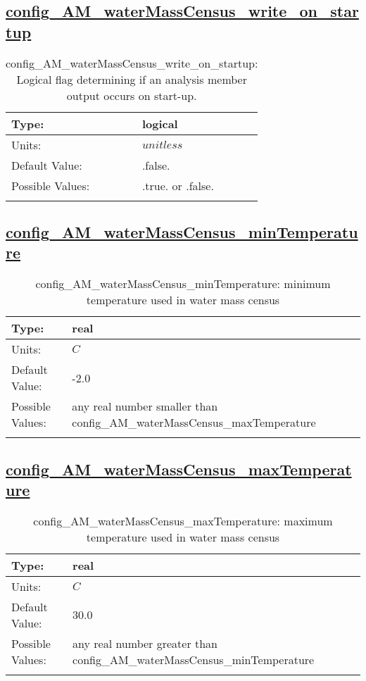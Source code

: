 \subsection[config\_AM\_waterMassCensus\_write\_on\_startup]{\hyperref[sec:nm_tab_AM_waterMassCensus]{config\_AM\_waterMassCensus\_write\_on\_startup}}
\label{subsec:nm_sec_config_AM_waterMassCensus_write_on_startup}
\begin{center}
\begin{longtable}{| p{2.0in} || p{4.0in} |}
    \hline
    Type: & logical \\
    \hline
    Units: & $unitless$ \\
    \hline
    Default Value: & .false. \\
    \hline
    Possible Values: & .true. or .false. \\
    \hline
    \caption{config\_AM\_waterMassCensus\_write\_on\_startup: Logical flag determining if an analysis member output occurs on start-up.}
\end{longtable}
\end{center}
\subsection[config\_AM\_waterMassCensus\_minTemperature]{\hyperref[sec:nm_tab_AM_waterMassCensus]{config\_AM\_waterMassCensus\_minTemperature}}
\label{subsec:nm_sec_config_AM_waterMassCensus_minTemperature}
\begin{center}
\begin{longtable}{| p{2.0in} || p{4.0in} |}
    \hline
    Type: & real \\
    \hline
    Units: & $C$ \\
    \hline
    Default Value: & -2.0 \\
    \hline
    Possible Values: & any real number smaller than config\_AM\_waterMassCensus\_maxTemperature \\
    \hline
    \caption{config\_AM\_waterMassCensus\_minTemperature: minimum temperature used in water mass census}
\end{longtable}
\end{center}
\subsection[config\_AM\_waterMassCensus\_maxTemperature]{\hyperref[sec:nm_tab_AM_waterMassCensus]{config\_AM\_waterMassCensus\_maxTemperature}}
\label{subsec:nm_sec_config_AM_waterMassCensus_maxTemperature}
\begin{center}
\begin{longtable}{| p{2.0in} || p{4.0in} |}
    \hline
    Type: & real \\
    \hline
    Units: & $C$ \\
    \hline
    Default Value: & 30.0 \\
    \hline
    Possible Values: & any real number greater than config\_AM\_waterMassCensus\_minTemperature \\
    \hline
    \caption{config\_AM\_waterMassCensus\_maxTemperature: maximum temperature used in water mass census}
\end{longtable}
\end{center}
